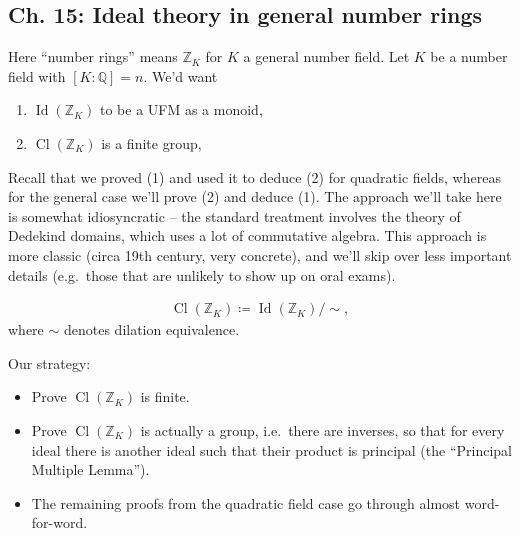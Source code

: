 \hypertarget{ch.-15-ideal-theory-in-general-number-rings}{%
\subsection{Ch. 15: Ideal theory in general number
rings}\label{ch.-15-ideal-theory-in-general-number-rings}}

\begin{remark}

Here ``number rings'' means \({\mathbb{Z}}_K\) for \(K\) a general
number field. Let \(K\) be a number field with
\([K: {\mathbb{Q}}] = n\). We'd want

\begin{enumerate}
\def\labelenumi{\arabic{enumi}.}
\tightlist
\item
  \(\operatorname{Id}({\mathbb{Z}}_K)\) to be a UFM as a monoid,
\item
  \(\operatorname{Cl}({\mathbb{Z}}_K)\) is a finite group,
\end{enumerate}

Recall that we proved (1) and used it to deduce (2) for quadratic
fields, whereas for the general case we'll prove (2) and deduce (1). The
approach we'll take here is somewhat idiosyncratic -- the standard
treatment involves the theory of Dedekind domains, which uses a lot of
commutative algebra. This approach is more classic (circa 19th century,
very concrete), and we'll skip over less important details (e.g.~those
that are unlikely to show up on oral exams).

\end{remark}

\begin{definition}

\begin{align*}
\operatorname{Cl}({\mathbb{Z}}_K) \coloneqq\operatorname{Id}({\mathbb{Z}}_K)/ \sim
,\end{align*}
where \(\sim\) denotes dilation equivalence.

\end{definition}

\begin{remark}

Our strategy:

\begin{itemize}
\tightlist
\item
  Prove \(\operatorname{Cl}({\mathbb{Z}}_K)\) is finite.
\item
  Prove \(\operatorname{Cl}({\mathbb{Z}}_K)\) is actually a group,
  i.e.~there are inverses, so that for every ideal there is another
  ideal such that their product is principal (the ``Principal Multiple
  Lemma'').
\item
  The remaining proofs from the quadratic field case go through almost
  word-for-word.
\end{itemize}

\end{remark}

